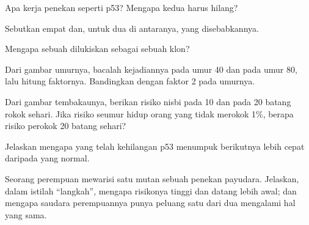 \begin{exercise}[$\star$]\label{exo:g11:cancer:3}
Apa kerja  penekan  seperti p53? Mengapa kedua 
harus hilang?
\end{exercise}

\begin{exercise}[$\star$]\label{exo:g11:cancer:4}
Sebutkan empat  dan, untuk dua di antaranya,  yang disebabkannya.
\end{exercise}

\begin{exercise}[$\star$]\label{exo:g11:cancer:5}
Mengapa sebuah  dilukiskan sebagai sebuah klon?
\end{exercise}

\begin{exercise}[$\star\star$]\label{exo:g11:cancer:6}
Dari gambar umurnya, bacalah kejadiannya pada umur 40 dan pada umur 80,
lalu hitung faktornya. Bandingkan dengan faktor 2 pada umurnya.
\end{exercise}

\begin{exercise}[$\star\star$]\label{exo:g11:cancer:7}
Dari gambar tembakaunya, berikan risiko nisbi pada 10 dan pada 20
batang rokok sehari. Jika risiko seumur hidup orang yang tidak merokok
1\%, berapa risiko perokok 20 batang sehari?
\end{exercise}

\begin{exercise}[$\star\star$]\label{exo:g11:cancer:8}
Jelaskan mengapa  yang telah kehilangan p53 menumpuk 
berikutnya lebih cepat daripada  yang normal.
\end{exercise}

\begin{exercise}[$\star\star$]\label{exo:g11:cancer:9}
Seorang perempuan mewarisi satu  mutan sebuah  penekan 
payudara. Jelaskan, dalam istilah ``langkah'', mengapa risikonya tinggi
dan  datang lebih awal; dan mengapa saudara perempuannya punya
peluang satu dari dua mengalami hal yang sama.
\end{exercise}


